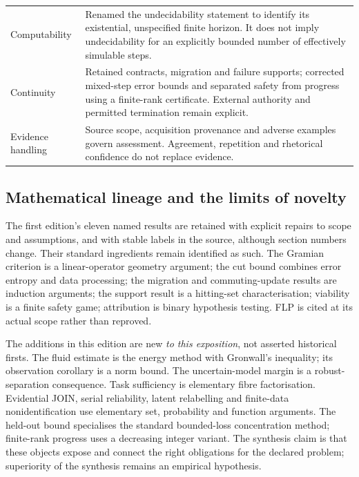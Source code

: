 \documentclass[11pt,a4paper]{article}
\theoremstyle{definition}
\theoremstyle{remark}
\begin{document}
\begin{longtable}{@{}>{\raggedright\arraybackslash}p{}>{\raggedright\arraybackslash}p{}@{}}
Computability & Renamed the undecidability statement to identify its existential, unspecified finite horizon. It does not imply undecidability for an explicitly bounded number of effectively simulable steps. \\\addlinespace
Continuity & Retained contracts, migration and failure supports; corrected mixed-step error bounds and separated safety from progress using a finite-rank certificate. External authority and permitted termination remain explicit. \\\addlinespace
Evidence handling & Source scope, acquisition provenance and adverse examples govern assessment. Agreement, repetition and rhetorical confidence do not replace evidence. \\
\bottomrule
\end{longtable}

\subsection{Mathematical lineage and the limits of novelty}
The first edition's eleven named results are retained with explicit repairs to scope and assumptions, and with stable labels in the source, although section numbers change. Their standard ingredients remain identified as such. The Gramian criterion is a linear-operator geometry argument; the cut bound combines error entropy and data processing; the migration and commuting-update results are induction arguments; the support result is a hitting-set characterisation; viability is a finite safety game; attribution is binary hypothesis testing. FLP is cited at its actual scope rather than reproved.

The additions in this edition are new \emph{to this exposition}, not asserted historical firsts. The fluid estimate is the energy method with Gronwall's inequality; its observation corollary is a norm bound. The uncertain-model margin is a robust-separation consequence. Task sufficiency is elementary fibre factorisation. Evidential JOIN, serial reliability, latent relabelling and finite-data nonidentification use elementary set, probability and function arguments. The held-out bound specialises the standard bounded-loss concentration method; finite-rank progress uses a decreasing integer variant. The synthesis claim is that these objects expose and connect the right obligations for the declared problem; superiority of the synthesis remains an empirical hypothesis.
\end{document}
